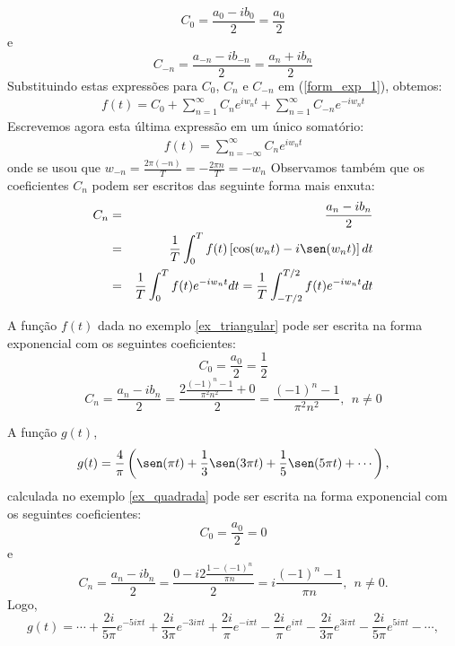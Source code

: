 \begin{equation}
C_0 = \frac{a_0 - ib_0}{2}=\frac{a_0}{2}
\end{equation}
e
\begin{equation}
C_{-n} = \frac{a_{-n} - ib_{-n}}{2}=\frac{a_{n} + ib_{n}}{2}
\end{equation}
Substituindo estas expressões para $C_0$, $C_{n}$ e $C_{-n}$ em (\ref{form_exp_1}), obtemos:
\begin{eqnarray*}
f(t)=C_0+\sum_{n=1}^\infty C_n e^{iw_nt}+\sum_{n=1}^\infty C_{-n}e^{-iw_nt}
\end{eqnarray*}
Escrevemos agora esta última expressão em um único somatório:
\begin{eqnarray}\label{forma_exp}
f(t)=\sum_{n=-\infty}^\infty C_n e^{iw_nt}
\end{eqnarray}
onde se usou que $w_{-n}=\frac{2\pi (-n)}{T}=-\frac{2\pi n}{T}=-w_n$
Observamos também que os coeficientes $C_n$ podem ser escritos das seguinte forma mais enxuta:
\begin{eqnarray*}
C_n &=& \frac{a_n - ib_n}{2}\\
&=& \frac{1}{T}\int_0^Tf(t)\left[\cos(w_n t)-i\sen(w_n t)\right]dt\\
&=&\frac{1}{T}\int_0^Tf(t)e^{-iw_nt}dt =\frac{1}{T}\int_{-T/2}^{T/2}f(t)e^{-iw_nt}dt 
\end{eqnarray*}
\begin{ex}{\label{ex_exp_1}} A função $f(t)$ dada no exemplo \ref{ex_triangular} pode ser escrita na forma exponencial com os seguintes coeficientes:
\begin{equation}C_0=\frac{a_0}{2}=\frac{1}{2}\end{equation}
\begin{equation}C_n=\frac{a_n-ib_n}{2}=\frac{2\frac{(-1)^n-1}{\pi^2n^2}+0}{2}=\frac{(-1)^n-1}{\pi^2n^2},~~n\neq 0\end{equation}
\end{ex}
\begin{ex}{\label{ex_exp_2}} A função $g(t)$,
\begin{equation}
g(t)=\frac{4}{\pi}\left(\sen(\pi t)+\frac{1}{3}\sen(3\pi t)+\frac{1}{5}\sen(5\pi t)+\cdots\right),
\end{equation}
calculada no exemplo \ref{ex_quadrada} pode ser escrita na forma exponencial com os seguintes coeficientes:
\begin{equation}C_0=\frac{a_0}{2}=0\end{equation}
e
\begin{equation}C_n=\frac{a_n-ib_n}{2}=\frac{0-i2\frac{1-(-1)^n}{\pi n}}{2}=i\frac{(-1)^n-1}{\pi n},~~n\neq 0.\end{equation}
Logo,
\begin{equation}
g(t)=\cdots+\frac{2i}{5\pi}e^{-5i\pi t}+\frac{2i}{3\pi}e^{-3i\pi t}+\frac{2i}{\pi}e^{-i\pi t}-\frac{2i}{\pi}e^{i\pi t}-\frac{2i}{3\pi}e^{3i\pi t}-\frac{2i}{5\pi}e^{5i\pi t}-\cdots,
\end{equation}
\end{ex}




